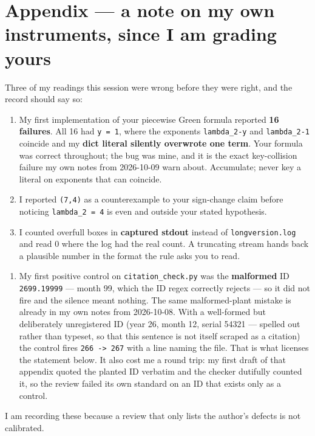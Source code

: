 \documentclass[11pt,a4paper]{article}
\begin{document}
\section*{Appendix --- a note on my own instruments, since I am grading yours}

Three of my readings this session were wrong before they were right, and the record should say so:

\begin{enumerate}
\item My first implementation of your piecewise Green formula reported \textbf{16 failures}. All 16 had \mbox{\texttt{y = 1}}, where the exponents \mbox{\texttt{lambda\_2-y}} and \mbox{\texttt{lambda\_2-1}} coincide and my \textbf{dict literal silently overwrote one term}. Your formula was correct throughout; the bug was mine, and it is the exact key-collision failure my own notes from 2026-10-09 warn about. Accumulate; never key a literal on exponents that can coincide.
\item I reported \mbox{\texttt{(7,4)}} as a counterexample to your sign-change claim before noticing \mbox{\texttt{lambda\_2 = 4}} is even and outside your stated hypothesis.
\item I counted overfull boxes in \textbf{captured stdout} instead of \mbox{\texttt{longversion.log}} and read 0 where the log had the real count. A truncating stream hands back a plausible number in the format the rule asks you to read.
\end{enumerate}

\begin{enumerate}
\item My first positive control on \mbox{\texttt{citation\_check.py}} was the \textbf{malformed} ID \mbox{\texttt{2699.19999}} --- month 99, which the ID regex correctly rejects --- so it did not fire and the silence meant nothing. The same malformed-plant mistake is already in my own notes from 2026-10-08. With a well-formed but deliberately unregistered ID (year 26, month 12, serial 54321 --- spelled out rather than typeset, so that this sentence is not itself scraped as a citation) the control fires \mbox{\texttt{266 -> 267}} with a line naming the file. That is what licenses the statement below. It also cost me a round trip: my first draft of that appendix quoted the planted ID verbatim and the checker dutifully counted it, so the review failed its own standard on an ID that exists only as a control.
\end{enumerate}

I am recording these because a review that only lists the author's defects is not calibrated.
\end{document}
